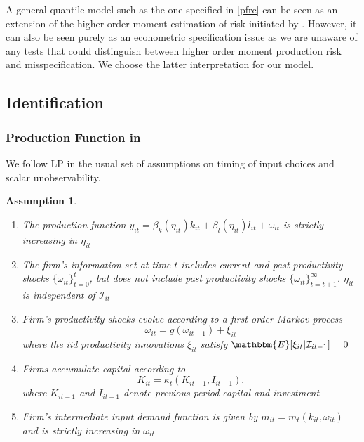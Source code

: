 \documentclass[11pt]{article}
\newtheorem{assump}{Assumption}[section]
\begin{document}
A general quantile model such as the one specified in \eqref{pfrc} can be seen as an extension of the higher-order moment estimation of risk initiated by \cite{Antle1983}. However, it can also be seen purely as an econometric specification issue as we are unaware of any tests that could distinguish between higher order moment production risk and misspecification. We choose the latter interpretation for our model. 

\subsection{Identification}
\subsubsection{Production Function in \cite{Levinsohn2003}}
We follow LP in the usual set of assumptions on timing of input choices and scalar unobservability.

\begin{assump} \label{qpfassume}
~
\begin{enumerate}[label=(\alph*)]
	\item The production function $y_{it}=\beta_{k}(\eta_{it})k_{it}+\beta_{l}(\eta_{it})l_{it}+\omega_{it}$ is strictly increasing in $\eta_{it}$
	\item The firm's information set at time $t$ includes current and past productivity shocks $\{\omega_{it}\}_{t=0}^{t}$, but does not include past productivity shocks $\{\omega_{it}\}_{t=t+1}^{\infty}$. $\eta_{it}$ is independent of $\mathcal{I}_{it}$
	\item Firm's productivity shocks evolve according to a first-order Markov process
	\begin{equation}
	\omega_{it}=g(\omega_{it-1})+\xi_{it}
	\end{equation}
	where the iid productivity innovations $\xi_{it}$ satisfy $\mathbbm{E}[\xi_{it}|\mathcal{I}_{it-1}]=0$
	\item Firms accumulate capital according to
	\begin{equation}
	    K_{it}=\kappa_{t}(K_{it-1}, I_{it-1}).
	\end{equation}
	where $K_{it-1}$ and $I_{it-1}$ denote previous period capital and investment
	\item Firm's intermediate input demand function is given by $m_{it}=m_{t}(k_{it}, \omega_{it})$ and is strictly increasing in $\omega_{it}$
\end{enumerate}
\end{assump}
\end{document}
